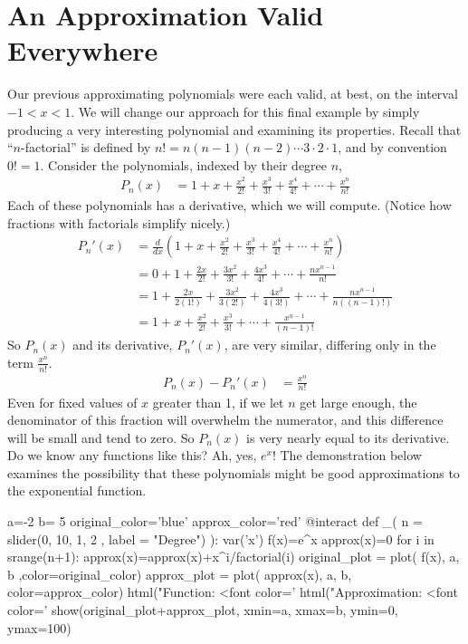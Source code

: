 \documentclass[12pt]{article}
\begin{document}
\section{An Approximation Valid Everywhere}
%
Our previous approximating polynomials were each valid, at best, on the interval $-1<x<1$.  We will change our approach for this final example by simply producing a very interesting polynomial and examining its properties.  Recall that ``$n$-factorial'' is defined by $n!=n(n-1)(n-2)\cdots3\cdot2\cdot1$, and by convention $0!=1$.  Consider the polynomials, indexed by their degree $n$,
%
%
\begin{align*}
P_n(x)&=1+x+\frac{x^2}{2!}+\frac{x^3}{3!}+\frac{x^4}{4!}+\cdots+\frac{x^n}{n!}
\end{align*}
%
Each of these polynomials has a derivative, which we will compute.  (Notice how fractions with factorials simplify nicely.)
%
\begin{align*}
P_n'(x)
&=\frac{d}{dx}\left(1+x+\frac{x^2}{2!}+\frac{x^3}{3!}+\frac{x^4}{4!}+\cdots+\frac{x^n}{n!}\right)\\
&=0+1+\frac{2x}{2!}+\frac{3x^2}{3!}+\frac{4x^3}{4!}+\cdots+\frac{nx^{n-1}}{n!}\\
&=1+\frac{2x}{2(1!)}+\frac{3x^2}{3(2!)}+\frac{4x^3}{4(3!)}+\cdots+\frac{nx^{n-1}}{n((n-1)!)}\\
&=1+x+\frac{x^2}{2!}+\frac{x^3}{3!}+\cdots+\frac{x^{n-1}}{(n-1)!}
\end{align*}
%
So $P_n(x)$ and its derivative, $P_n'(x)$, are very similar, differing only in the term $\displaystyle\frac{x^n}{n!}$.  
%
\begin{align*}
P_n(x)-P_n'(x)&=\frac{x^n}{n!}
\end{align*}
%
Even for fixed values of $x$ greater than 1, if we let $n$ get large enough, the denominator of this fraction will overwhelm the numerator, and this difference will be small and tend to zero.  So $P_n(x)$ is very nearly equal to its derivative.  Do we know any functions like this?  Ah, yes, $e^x$!  The demonstration below examines the possibility that these polynomials might be good approximations to the exponential function.
%
\begin{sageverbatim}
a=-2
b= 5
original_color='blue'
approx_color='red'
@interact
def _( n = slider(0, 10, 1, 2 , label = "Degree") ):
    var('x')
    f(x)=e^x
    approx(x)=0
    for i in srange(n+1):
        approx(x)=approx(x)+x^i/factorial(i)
    original_plot = plot( f(x), a, b ,color=original_color)
    approx_plot = plot( approx(x),  a, b, color=approx_color)
    html("Function: <font color='%
    html("Approximation: <font color='%
    show(original_plot+approx_plot, xmin=a, xmax=b, ymin=0, ymax=100)
\end{sageverbatim}
%
%
\end{document}
